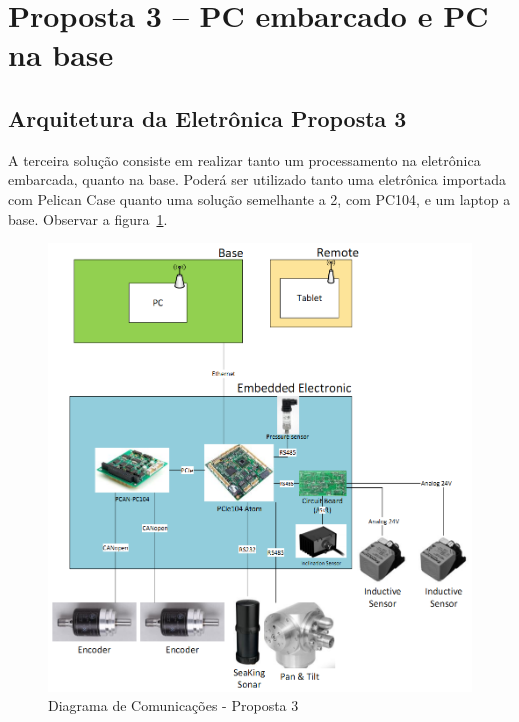 


\section{Proposta 3 – PC embarcado e PC na base}

\subsection{Arquitetura da Eletrônica Proposta 3}
A terceira solução consiste em realizar tanto um processamento na eletrônica
embarcada, quanto na base. Poderá ser utilizado tanto uma eletrônica importada
com Pelican Case quanto uma solução semelhante a 2, com PC104, e um laptop a
base. Observar a figura~\ref{prop3}.

\begin{figure}[H]
    \centering
    \includegraphics[width=0.5\columnwidth]{figs/eletronica/5.png}
    \caption{Diagrama de Comunicações - Proposta 3}
    \label{prop3}
\end{figure} 

